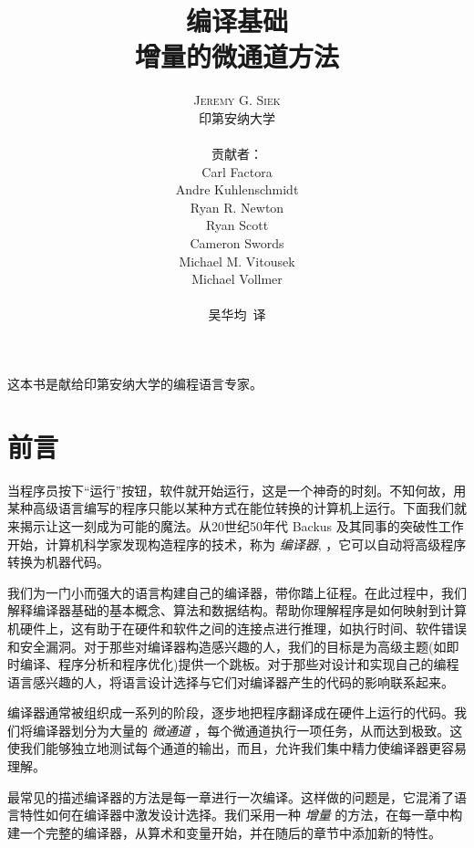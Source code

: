 \documentclass[11pt]{book}
\title{\Huge \textbf{编译基础} \\
  \huge 增量的微通道方法}
\author{\textsc{Jeremy G. Siek} \\
  印第安纳大学 \\
  \\
  贡献者： \\
  Carl Factora \\
  Andre Kuhlenschmidt \\
  Ryan R. Newton \\
  Ryan Scott \\
  Cameron Swords \\
  Michael M. Vitousek \\
  Michael Vollmer \\
  \\
  吴华均\  译
   }
\newenvironment{dedication}
{
   \cleardoublepage
   \thispagestyle{empty}
   \vspace*{\stretch{1}}
   \hfill\begin{minipage}[t]{0.66\textwidth}
   \raggedright
}
{
   \end{minipage}
   \vspace*{\stretch{3}}
   \clearpage
}
\begin{document}
\frontmatter
\maketitle

\begin{dedication}
这本书是献给印第安纳大学的编程语言专家。
\end{dedication}

\renewcommand{\contentsname}{目录}
\renewcommand{\figurename}{图}
\renewcommand\listfigurename{插图目录}
\renewcommand{\bibname}{参考文献}
\renewcommand{\tablename}{表}
\tableofcontents
\listoffigures


\mainmatter

\chapter*{前言}
\label{ch:qianyan}

当程序员按下“运行”按钮，软件就开始运行，这是一个神奇的时刻。不知何故，用某种高级语言编写的程序只能以某种方式在能位转换的计算机上运行。下面我们就来揭示让这一刻成为可能的魔法。从20世纪50年代 Backus 及其同事的突破性工作开始，计算机科学家发现构造程序的技术，称为 \emph{编译器}, ，它可以自动将高级程序转换为机器代码。

我们为一门小而强大的语言构建自己的编译器，带你踏上征程。在此过程中，我们解释编译器基础的基本概念、算法和数据结构。帮助你理解程序是如何映射到计算机硬件上，这有助于在硬件和软件之间的连接点进行推理，如执行时间、软件错误和安全漏洞。对于那些对编译器构造感兴趣的人，我们的目标是为高级主题(如即时编译、程序分析和程序优化)提供一个跳板。对于那些对设计和实现自己的编程语言感兴趣的人，将语言设计选择与它们对编译器产生的代码的影响联系起来。

编译器通常被组织成一系列的阶段，逐步地把程序翻译成在硬件上运行的代码。我们将编译器划分为大量的 \emph{微通道} ，每个微通道执行一项任务，从而达到极致。这使我们能够独立地测试每个通道的输出，而且，允许我们集中精力使编译器更容易理解。


最常见的描述编译器的方法是每一章进行一次编译。这样做的问题是，它混淆了语言特性如何在编译器中激发设计选择。我们采用一种
\emph{增量} 的方法，在每一章中构建一个完整的编译器，从算术和变量开始，并在随后的章节中添加新的特性。
\end{document}
